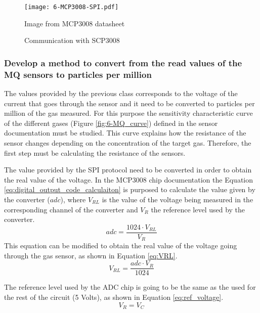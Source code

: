 \begin{figure}[!h]
	\begin{center}
		\texttt{[image: 6-MCP3008-SPI.pdf]}
		\caption{Communication with SCP3008}{Image from MCP3008 datasheet \cite{ADC}}
		\label{fig:6-MCP3008-SPI}
	\end{center}
\end{figure}




\subsubsection{Develop a method to convert from the read values of the MQ sensors to particles per million}
The values provided by the previous class corresponds to the voltage of the current that goes through the sensor and it need to be converted to particles per million of the gas measured. For this purpose the sensitivity characteristic curve of the different gases (Figure \ref{fig:6-MQ_curve}) defined in the sensor documentation must be studied. This curve explains how the resistance of the sensor changes depending on the concentration of the target gas. Therefore, the first step must be calculating the resistance of the sensors. 

The value provided by the \ac{SPI} protocol need to be converted in order to obtain the real value of the voltage. In the MCP3008 chip documentation \cite{ADC} the Equation \ref{eq:digital_output_code_calculaiton} is purposed to calculate the value given by the converter ($adc$), where ${V}_{RL}$ is the value of the voltage being measured in the corresponding channel of the converter and ${V}_{R}$ the reference level used by the converter.
\begin{equation} \label{eq:digital_output_code_calculaiton}
adc = \frac { 1024\cdot { V }_{ RL } }{ { V }_{ R } } 
\end{equation}
This equation can be modified to obtain the real value of the voltage going through the gas sensor, as shown in Equation \ref{eq:VRL}.
\begin{equation} \label{eq:VRL}
{ V }_{ RL } =\frac { adc \cdot  { V }_{ R }}{ 1024 }  
\end{equation}

The reference level used by the \ac{ADC} chip is going to be the same as the used for the rest of the circuit (5 Volts), as shown in Equation \ref{eq:ref_voltage}.
\begin{equation} \label{eq:ref_voltage}
{V}_{R} = {V}_{C}
\end{equation}

